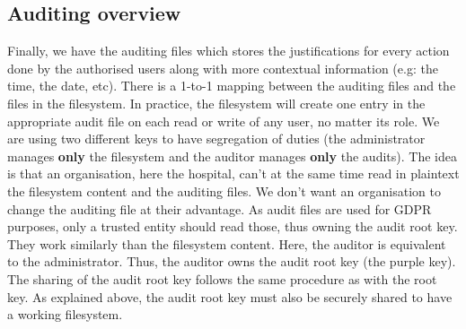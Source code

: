 \documentclass[../main.tex]{subfiles}
\begin{document}
\subsection{Auditing overview}
\label{section:lauxus:approach_audit}
\par Finally, we have the auditing files which stores the justifications for every action done by the authorised users along with more contextual information (e.g: the time, the date, etc). There is a 1-to-1 mapping between the auditing files and the files in the filesystem. In practice, the filesystem will create one entry in the appropriate audit file on each read or write of any user, no matter its role. We are using two different keys to have segregation of duties (the administrator manages \textbf{only} the filesystem and the auditor manages \textbf{only} the audits). The idea is that an organisation, here the hospital, can't at the same time read in plaintext the filesystem content and the auditing files. We don't want an organisation to change the auditing file at their advantage. As audit files are used for GDPR purposes, only a trusted entity should read those, thus owning the audit root key. They work similarly than the filesystem content. Here, the auditor is equivalent to the administrator. Thus, the auditor owns the audit root key (the purple key). The sharing of the audit root key follows the same procedure as with the root key. As explained above, the audit root key must also be securely shared to have a working filesystem.

\newpage
\end{document}
